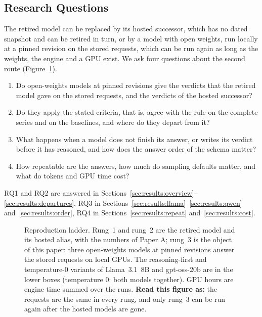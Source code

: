 \subsection{Research Questions}
\label{sec:introduction:rqs}

The retired model can be replaced by its hosted successor, which has no dated snapshot and can be retired in turn, or by a model with open weights, run locally at a pinned revision on the stored requests, which can be run again as long as the weights, the engine and a GPU exist. We ask four questions about the second route (Figure~\ref{fig:ladder}).
\begin{enumerate}[label=RQ\arabic*.,leftmargin=*]
\item Do open-weights models at pinned revisions give the verdicts that the retired model gave on the stored requests, and the verdicts of the hosted successor?
\item Do they apply the stated criteria, that is, agree with the rule on the complete series and on the baselines, and where do they depart from it?
\item What happens when a model does not finish its answer, or writes its verdict before it has reasoned, and how does the answer order of the schema matter?
\item How repeatable are the answers, how much do sampling defaults matter, and what do tokens and GPU time cost?
\end{enumerate}
RQ1 and RQ2 are answered in Sections~\ref{sec:results:overview}--\ref{sec:results:departures}, RQ3 in Sections~\ref{sec:results:llama}--\ref{sec:results:qwen} and~\ref{sec:results:order}, RQ4 in Sections~\ref{sec:results:repeat} and~\ref{sec:results:cost}.

\begin{figure}[!t]
\centering
\resultfigure{\figLadder}
\caption{Reproduction ladder. Rung~1 and rung~2 are the retired model and its hosted alias, with the numbers of Paper A; rung~3 is the object of this paper: three open-weights models at pinned revisions answer the stored requests on local GPUs. The reasoning-first and temperature-0 variants of Llama~3.1~8B and gpt-oss-20b are in the lower boxes (temperature 0: both models together). GPU hours are engine time summed over the runs. \textbf{Read this figure as:} the requests are the same in every rung, and only rung~3 can be run again after the hosted models are gone.}
\label{fig:ladder}
\end{figure}

